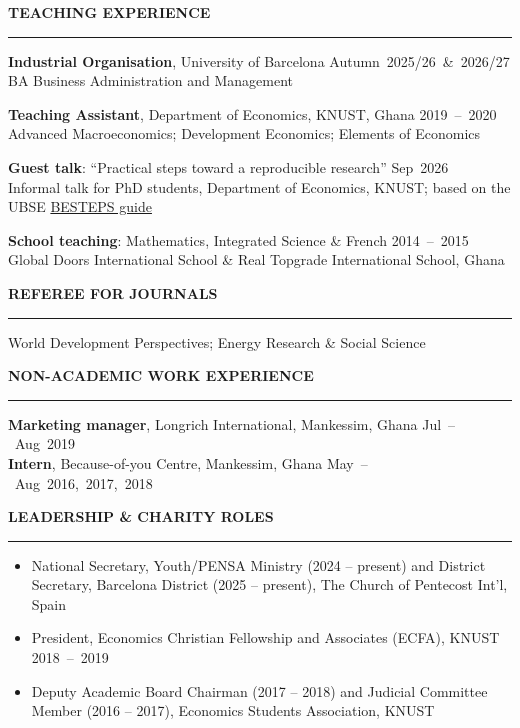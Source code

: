\documentclass{resume} %
\def\sectionskip{\vspace{4pt}}
\def\sectionlineskip{\smallskip}
\renewenvironment{rSection}[1]{%
  \sectionskip
  \MakeUppercase{{\bf #1}}%
  \sectionlineskip
  \hrule
  \begin{list}{}{\setlength{\leftmargin}{0em}\setlength{\topsep}{5pt}\setlength{\itemsep}{0pt}\setlength{\parsep}{0pt}}%
  \item[]
}{%
  \end{list}
}
\newcommand{\when}[1]{\hfill\mbox{#1}}
\begin{document}
\begin{rSection}{Teaching Experience}
\textbf{Industrial Organisation}, University of Barcelona \when{Autumn 2025/26 \& 2026/27}\\
{\small BA Business Administration and Management}

\textbf{Teaching Assistant}, Department of Economics, KNUST, Ghana \when{2019 -- 2020}\\
{\small Advanced Macroeconomics; Development Economics; Elements of Economics}

\textbf{Guest talk}: ``Practical steps toward a reproducible research'' \when{Sep 2026}\\
{\small Informal talk for PhD students, Department of Economics, KNUST; based on the UBSE \href{https://hdl.handle.net/2445/223454}{BESTEPS guide}}

\textbf{School teaching}: Mathematics, Integrated Science \& French \when{2014 -- 2015}\\
{\small Global Doors International School \& Real Topgrade International School, Ghana}
\end{rSection}


\begin{rSection}{Referee for Journals}
World Development Perspectives; Energy Research \& Social Science
\end{rSection}




\begin{rSection}{Non-Academic Work Experience}
\textbf{Marketing manager}, Longrich International, Mankessim, Ghana \when{Jul -- Aug 2019}\\
\textbf{Intern}, Because-of-you Centre, Mankessim, Ghana \when{May -- Aug 2016, 2017, 2018}
\end{rSection}


\begin{rSection}{Leadership \& Charity Roles}
\begin{itemize}
\item National Secretary, Youth/PENSA Ministry (2024 -- present) and District Secretary, Barcelona District (2025 -- present), The Church of Pentecost Int'l, Spain
\item President, Economics Christian Fellowship and Associates (ECFA), KNUST \when{2018 -- 2019}
\item Deputy Academic Board Chairman (2017 -- 2018) and Judicial Committee Member (2016 -- 2017), Economics Students Association, KNUST
\end{itemize}
\end{rSection}
\end{document}
